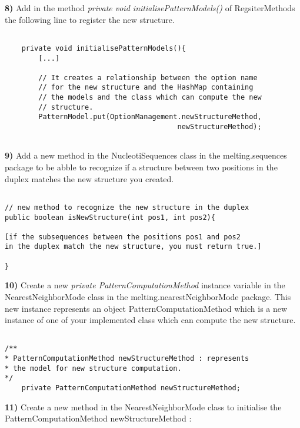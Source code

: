 \documentclass{article}
\begin{document}
\textbf{8)} Add in the method \textit{private void initialisePatternModels()} of RegsiterMethods the
following line to register the new structure.

\begin{verbatim}

	private void initialisePatternModels(){
		[...]
		
		// It creates a relationship between the option name 
		// for the new structure and the HashMap containing 
		// the models and the class which can compute the new 
		// structure.
		PatternModel.put(OptionManagement.newStructureMethod, 
		                                 newStructureMethod);
		
\end{verbatim}


\textbf{9)} Add a new method in the NucleotiSequences class in the melting.sequences package to be abble 
to recognize if a structure between two positions in the duplex matches the new structure you created.

\begin{verbatim}

// new method to recognize the new structure in the duplex
public boolean isNewStructure(int pos1, int pos2){

[if the subsequences between the positions pos1 and pos2
in the duplex match the new structure, you must return true.]

}

\end{verbatim}


\textbf{10)} Create a new \textit{private PatternComputationMethod} instance variable in the NearestNeighborMode
class in the melting.nearestNeighborMode package. This new instance represents an object PatternComputationMethod
which is a new instance of one of your implemented class which can compute the new structure.

\begin{verbatim}

/**
* PatternComputationMethod newStructureMethod : represents 
* the model for new structure computation.
*/
	private PatternComputationMethod newStructureMethod;

\end{verbatim}


\textbf{11)} Create a new method in the NearestNeighborMode class to initialise the PatternComputationMethod 
newStructureMethod :
\end{document}
